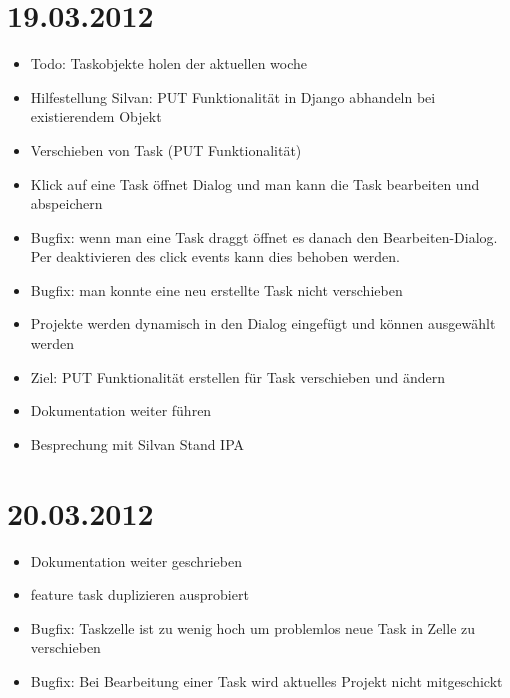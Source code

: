 \section{19.03.2012}
    \begin{itemize}
        \item Todo: Taskobjekte holen der aktuellen woche
        \item Hilfestellung Silvan: PUT Funktionalität in Django abhandeln bei existierendem Objekt
        \item Verschieben von Task (PUT Funktionalität)
        \item Klick auf eine Task öffnet Dialog und man kann die Task bearbeiten und abspeichern
        \item Bugfix: wenn man eine Task draggt öffnet es danach den Bearbeiten-Dialog. Per deaktivieren des click events kann dies behoben werden.
        \item Bugfix: man konnte eine neu erstellte Task nicht verschieben
        \item Projekte werden dynamisch in den Dialog eingefügt und können ausgewählt werden
        \item Ziel: PUT Funktionalität erstellen für Task verschieben und ändern
        \item Dokumentation weiter führen
        \item Besprechung mit Silvan Stand IPA
    \end{itemize}
\section{20.03.2012}
    \begin{itemize}
        \item Dokumentation weiter geschrieben
        \item feature task duplizieren ausprobiert
        \item Bugfix: Taskzelle ist zu wenig hoch um problemlos neue Task in Zelle zu verschieben
        \item Bugfix: Bei Bearbeitung einer Task wird aktuelles Projekt nicht mitgeschickt
    \end{itemize}